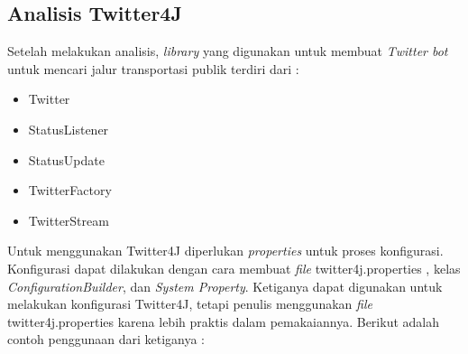 \subsection{Analisis Twitter4J}
Setelah melakukan analisis, \textit{library} yang digunakan untuk membuat \textit{Twitter bot} untuk mencari jalur transportasi publik terdiri dari :
\begin{itemize}
	\item Twitter
	\item StatusListener
	\item StatusUpdate
	\item TwitterFactory
	\item TwitterStream
\end{itemize}

Untuk menggunakan Twitter4J diperlukan \textit{properties} untuk proses konfigurasi. Konfigurasi dapat dilakukan dengan cara membuat \textit{file} twitter4j.properties , kelas \textit{ConfigurationBuilder}, dan \textit{System Property}. Ketiganya dapat digunakan untuk melakukan konfigurasi Twitter4J, tetapi penulis menggunakan \textit{file} twitter4j.properties karena lebih praktis dalam pemakaiannya. Berikut adalah contoh penggunaan dari ketiganya :

